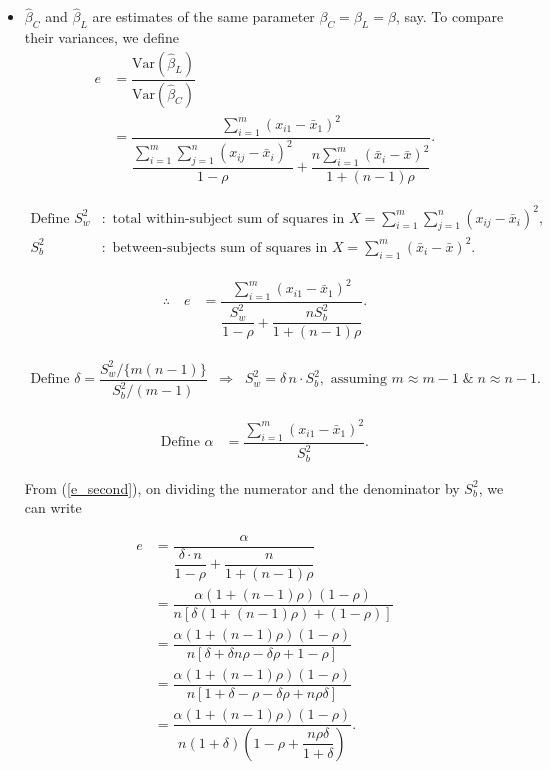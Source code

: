 \documentclass[11pt, a4paper]{article}
\begin{document}
\begin{itemize}
\begin{align*}
\therefore \; \text{Var}(\hat{\beta}_L) = \sigma^2 (A^{-1})_{22}.
\end{align*}

\item[\scalebox{2.0}{\twemoji{keycap: 4}}] \hspace{0.2cm} $\hat{\beta}_C$ and $\hat{\beta}_L$ are estimates of the same parameter $\beta_C = \beta_L = \beta$, say. To compare their variances, we define
\begin{align*}
e 
&= \dfrac{\text{Var}(\hat{\beta}_L)}{\text{Var}(\hat{\beta}_C)} \\[1em]
&= 
\dfrac{\sum\limits_{i=1}^{m} (x_{i1} - \bar{x}_1)^2}{\dfrac{\sum\limits_{i=1}^{m} \sum\limits_{j=1}^{n} (x_{ij} - \bar{x}_i)^2}{1-\rho} + \dfrac{n \sum\limits_{i=1}^{m} (\bar{x}_i - \bar{x})^2}{1+(n-1)\rho}}.
\end{align*}

\begin{align*}
\text{Define } S_w^2 
&: \text{ total within-subject sum of squares in } X
= \sum\limits_{i=1}^{m} \sum\limits_{j=1}^{n} (x_{ij} - \bar{x}_i)^2, \\[10pt]
S_b^2 
&: \text{ between-subjects sum of squares in } X
= \sum\limits_{i=1}^{m} (\bar{x}_i - \bar{x})^2.
\end{align*}

\begin{align}\label{e_second}
\therefore\quad
e
&=
\dfrac{
\sum\limits_{i=1}^{m} (x_{i1} - \bar{x}_1)^2
}{
\dfrac{S_w^2}{1-\rho}
+
\dfrac{n S_b^2}{1+(n-1)\rho}
}.
\end{align}

\begin{align*}
\text{Define } \delta = \dfrac{S_w^2 / \{m(n-1)\}}{S_b^2 / (m-1)} \;\;\Rightarrow\;\;
S_w^2 = \delta \, n \cdot S_b^2, \text{ assuming } m \approx m - 1 \; \& \; n \approx n - 1.
\end{align*}

\begin{align*}
\text{Define } \alpha 
&= \dfrac{\sum\limits_{i=1}^{m} (x_{i1} - \bar{x}_1)^2}{S_b^2}.
\end{align*}

From (\ref{e_second}), on dividing the numerator and the denominator by $S_b^2$, we can write

\begin{align}\label{e_third}
e 
&= \dfrac{\alpha}{\dfrac{\delta \cdot n}{1-\rho} + \dfrac{n}{1+(n-1)\rho}} \nonumber \\[8pt]
&= \dfrac{\alpha (1+(n-1)\rho)(1-\rho)}{n \left[\delta(1+(n-1)\rho) + (1-\rho)\right]} \nonumber \\[8pt]
&= \dfrac{\alpha (1+(n-1)\rho)(1-\rho)}{n \left[\delta + \delta n \rho - \delta \rho + 1 - \rho \right]} \nonumber \\[8pt]
&= \dfrac{\alpha (1+(n-1)\rho)(1-\rho)}{n \left[1 + \delta - \rho - \delta \rho + n \rho \delta \right]} \nonumber \\[8pt]
&= \dfrac{\alpha (1+(n-1)\rho)(1-\rho)}{n(1+\delta)\left(1 - \rho + \dfrac{n\rho\delta}{1+\delta}\right)}.
\end{align}


\end{itemize}
\end{document}
